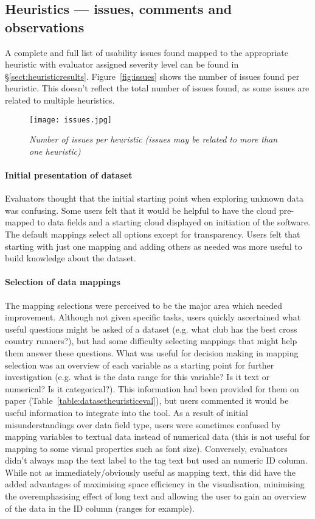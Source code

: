 
\subsection{Heuristics --- issues, comments and observations}

A complete and full list of usability issues found mapped to the appropriate heuristic with evaluator assigned severity level can be found in \S\ref{sect:heuristicresults}. Figure~\vref{fig:issues} shows the number of issues found per heuristic. This doesn't reflect the total number of issues found, as some issues are related to multiple heuristics.

\begin{figure}[!htb]
	\centering
	\texttt{[image: issues.jpg]}
	\caption{\textit{Number of issues per heuristic (issues may be related to more than one heuristic)}}
	\label{fig:issues}
\end{figure}

\paragraph{Initial presentation of dataset}
Evaluators thought that the initial starting point when exploring unknown data was confusing. Some users felt that it would be helpful to have the cloud pre-mapped to data fields and a starting cloud displayed on initiation of the software. The default mappings select all options except for transparency. Users felt that starting with just one mapping and adding others as needed was more useful to build knowledge about the dataset.

\paragraph{Selection of data mappings}
The mapping selections were perceived to be the major area which needed improvement. Although not given specific tasks, users quickly ascertained what useful questions might be asked of a dataset (e.g. what club has the best cross country runners?), but had some difficulty selecting mappings that might help them answer these questions. What was useful for decision making in mapping selection was an overview of each variable as a starting point for further investigation (e.g. what is the data range for this variable? Is it text or numerical? Is it categorical?). This information had been provided for them on paper (Table~\vref{table:datasetheuristiceval}), but users commented it would be useful information to integrate into the tool. As a result of initial misunderstandings over data field type, users were sometimes confused by mapping variables to textual data instead of numerical data (this is not useful for mapping to some visual properties such as font size). Conversely, evaluators didn't always map the text label to the tag text but used an numeric ID column. While not as immediately/obviously useful as mapping text, this did have the added advantages of maximising space efficiency in the visualisation, minimising the overemphasising effect of long text and allowing the user to gain an overview of the data in the ID column (ranges for example).

